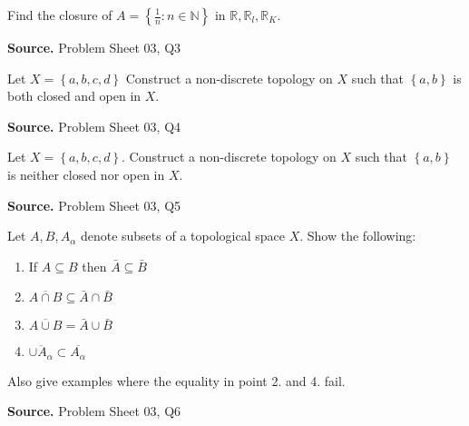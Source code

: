 \documentclass[12pt,twoside]{report}
\newenvironment*{source}{\hfill\scriptsize\textbf{Source.}\space}{\par}
\begin{document}
\begin{samepage}
\begin{ex}
Find the closure of $A = \left\{ \frac{1}{n}  :  n \in \mathbb{N} \right\}$ in $\mathbb{R}, \mathbb{R}_l, \mathbb{R}_K$.
\end{ex}
\begin{source}
Problem Sheet 03, Q3
\end{source}
\end{samepage}

\begin{samepage}
\begin{ex}
Let $X = \left\{ a, b, c, d \right\}$ Construct a non-discrete topology on $X$ such that $\left\{ a, b \right\}$ is both closed and open in $X$.
\end{ex}
\begin{source}
Problem Sheet 03, Q4
\end{source}
\end{samepage}

\begin{samepage}
\begin{ex}
Let $X = \left\{a, b, c, d \right\}$. Construct a non-discrete topology on $X$ such that $\left\{ a, b \right\}$ is neither closed nor open in $X$.
\end{ex}
\begin{source}
Problem Sheet 03, Q5
\end{source}
\end{samepage}

\begin{samepage}
\begin{ex}
Let $A, B, A_\alpha$ denote subsets of a topological space $X$. Show the following:
\begin{enumerate}
\item If $A \subseteq B$ then $\bar{A} \subseteq \bar{B}$
\item $\overline{ A \cap B } \subseteq \bar{A} \cap \bar{B}$
\item $\overline{ A \cup B } = \bar{A} \cup \bar{B}$
\item $\overline{ \cup A_\alpha } \subset \overline{ A_\alpha }$
\end{enumerate}
Also give examples where the equality in point 2. and 4. fail.
\end{ex}
\begin{source}
Problem Sheet 03, Q6
\end{source}
\end{samepage}
\end{document}
